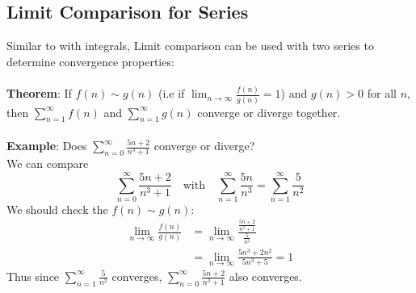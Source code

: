 \documentclass{report}
\begin{document}
\subsection{Limit Comparison for Series} %
Similar to with integrals, Limit comparison can be used with two series to determine convergence properties:\\
\vspace{1mm}\\
\textbf{Theorem}: If $f(n)\sim g(n)$ (i.e if $\lim_{n\to\infty}\frac{f(n)}{g(n)}=1$) and 
$g(n)>0$ for all $n$, then $\sum^\infty_{n=1}f(n)$ and $\sum^\infty_{n=1}g(n)$ converge or diverge together.\\
\vspace{1mm}\\
\textbf{Example}: Does $\sum_{n=0}^\infty\frac{5n+2}{n^3+1}$ converge or diverge?\\
We can compare 
\begin{equation*}
\sum_{n=0}^\infty\frac{5n+2}{n^3+1}\quad\text{with}\quad\sum_{n=1}^\infty\frac{5n}{n^3}
=\sum_{n=1}^\infty\frac{5}{n^2}
\end{equation*}
We should check the $f(n)\sim g(n)$:
\begin{align*}
\lim_{n\to\infty}\frac{f(n)}{g(n)}&=\lim_{n\to\infty}\frac{\frac{5n+2}{n^3+1}}{\frac{5}{n^2}}\\
&=\lim_{n\to\infty}\frac{5n^3+2n^2}{5n^3+5}=1
\end{align*}
Thus since $\sum_{n=1}^\infty\frac{5}{n^2}$ converges, 
$\sum_{n=0}^\infty\frac{5n+2}{n^3+1}$ also converges.
\newpage
\end{document}
